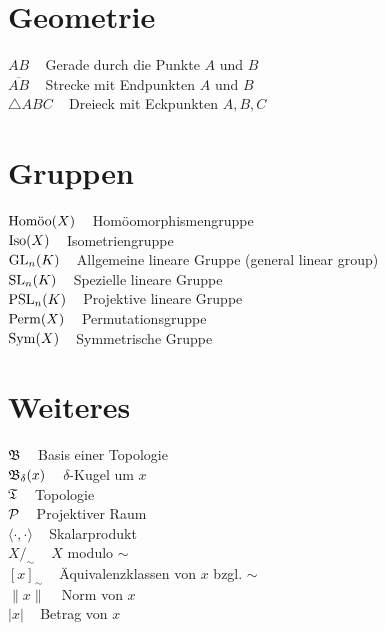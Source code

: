 \begin{minipage}[t]{0.45\textwidth}
\section*{Geometrie}
$AB\;\;\;$ Gerade durch die Punkte $A$ und $B$\\
$\overline{AB}\;\;\;$ Strecke mit Endpunkten $A$ und $B$\\
$\triangle ABC\;\;\;$ Dreieck mit Eckpunkten $A, B, C$\\
\end{minipage}
\begin{minipage}[t]{0.45\textwidth}
\section*{Gruppen}
$\Homoo(X)\;\;\;$ Homöomorphismengruppe\\
$\Iso(X)\;\;\;$ Isometriengruppe\\
$\GL_n(K)\;\;\;$ Allgemeine lineare Gruppe (general linear group)\\
$\SL_n(K)\;\;\;$ Spezielle lineare Gruppe\\
$\PSL_n(K)\;\;\;$ Projektive lineare Gruppe\\
$\Perm(X)\;\;\;$ Permutationsgruppe\\
$\Sym(X)\;\;\;$ Symmetrische Gruppe
\section*{Weiteres}
$\fB\;\;\;$ Basis einer Topologie\\
$\fB_\delta(x)\;\;\;$ $\delta$-Kugel um $x$\\
$\fT\;\;\;$ Topologie\\

$\praum\;\;\;$ Projektiver Raum\\
$\langle \cdot , \cdot \rangle\;\;\;$ Skalarprodukt\\
$X /_\sim\;\;\;$ $X$ modulo $\sim$\\
$[x]_\sim\;\;\;$ Äquivalenzklassen von $x$ bzgl. $\sim$\\
$\| x \|\;\;\;$ Norm von $x$\\
$| x |\;\;\;$ Betrag von $x$\\


\end{minipage}

